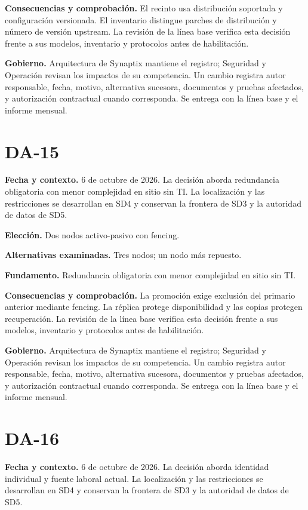 \documentclass[11pt,letterpaper]{report}
\begin{document}
\textbf{Consecuencias y comprobación.} El recinto usa distribución soportada y configuración versionada. El inventario distingue parches de distribución y número de versión upstream. La revisión de la línea base verifica esta decisión frente a sus modelos, inventario y protocolos antes de habilitación.

\textbf{Gobierno.} Arquitectura de Synaptix mantiene el registro; Seguridad y Operación revisan los impactos de su competencia. Un cambio registra autor responsable, fecha, motivo, alternativa sucesora, documentos y pruebas afectados, y autorización contractual cuando corresponda. Se entrega con la línea base y el informe mensual.

\section*{DA-15}

\textbf{Fecha y contexto.} 6 de octubre de 2026. La decisión aborda redundancia obligatoria con menor complejidad en sitio sin TI. La localización y las restricciones se desarrollan en SD4 y conservan la frontera de SD3 y la autoridad de datos de SD5.

\textbf{Elección.} Dos nodos activo-pasivo con fencing.

\textbf{Alternativas examinadas.} Tres nodos; un nodo más repuesto.

\textbf{Fundamento.} Redundancia obligatoria con menor complejidad en sitio sin TI.

\textbf{Consecuencias y comprobación.} La promoción exige exclusión del primario anterior mediante fencing. La réplica protege disponibilidad y las copias protegen recuperación. La revisión de la línea base verifica esta decisión frente a sus modelos, inventario y protocolos antes de habilitación.

\textbf{Gobierno.} Arquitectura de Synaptix mantiene el registro; Seguridad y Operación revisan los impactos de su competencia. Un cambio registra autor responsable, fecha, motivo, alternativa sucesora, documentos y pruebas afectados, y autorización contractual cuando corresponda. Se entrega con la línea base y el informe mensual.

\section*{DA-16}

\textbf{Fecha y contexto.} 6 de octubre de 2026. La decisión aborda identidad individual y fuente laboral actual. La localización y las restricciones se desarrollan en SD4 y conservan la frontera de SD3 y la autoridad de datos de SD5.
\end{document}
